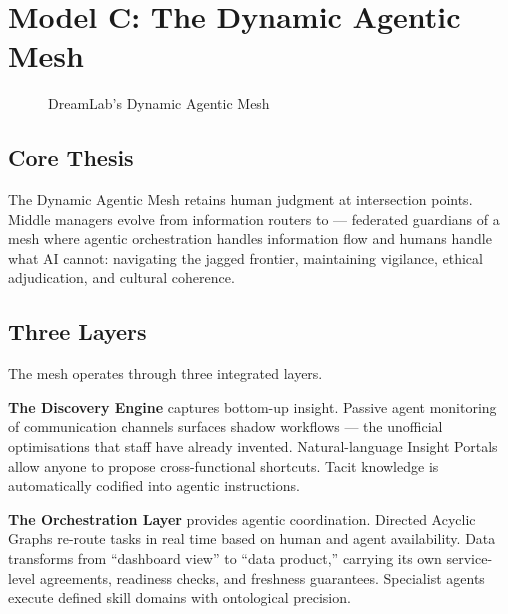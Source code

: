 \section{Model C: The Dynamic Agentic Mesh}

\begin{figure}[h]
\centering
{}
\caption{DreamLab's Dynamic Agentic Mesh}
\label{fig:agentic-mesh}
\end{figure}

\subsection{Core Thesis}

The Dynamic Agentic Mesh retains human judgment at intersection points. Middle managers evolve from information routers to  --- federated guardians of a mesh where agentic orchestration handles information flow and humans handle what AI cannot: navigating the jagged frontier, maintaining vigilance, ethical adjudication, and cultural coherence.

\subsection{Three Layers}

The mesh operates through three integrated layers.

\textbf{The Discovery Engine} captures bottom-up insight. Passive agent monitoring of communication channels surfaces shadow workflows --- the unofficial optimisations that staff have already invented. Natural-language Insight Portals allow anyone to propose cross-functional shortcuts. Tacit knowledge is automatically codified into agentic instructions.

\textbf{The Orchestration Layer} provides agentic coordination. Directed Acyclic Graphs re-route tasks in real time based on human and agent availability. Data transforms from ``dashboard view'' to ``data product,'' carrying its own service-level agreements, readiness checks, and freshness guarantees. Specialist agents execute defined skill domains with ontological precision.

